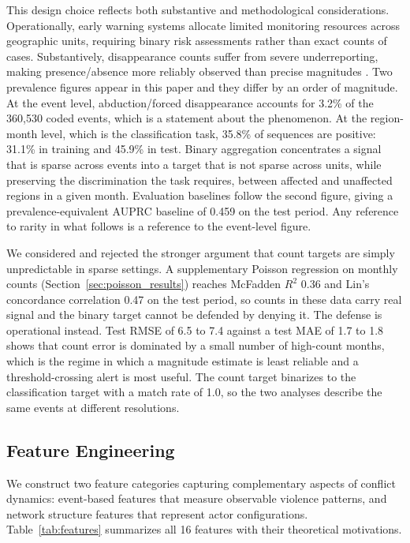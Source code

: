 \documentclass[pdflatex,sn-mathphys-num]{sn-jnl}%
\theoremstyle{thmstyleone}%
\theoremstyle{thmstyletwo}%
\theoremstyle{thmstylethree}%
\begin{document}
This design choice reflects both substantive and methodological considerations. Operationally, early warning systems allocate limited monitoring resources across geographic units, requiring binary risk assessments rather than exact counts of cases. Substantively, disappearance counts suffer from severe underreporting, making presence/absence more reliably observed than precise magnitudes \cite{hrdag2024datasets}. Two prevalence figures appear in this paper and they differ by an order of magnitude. At the event level, abduction/forced disappearance accounts for 3.2\% of the 360,530 coded events, which is a statement about the phenomenon. At the region-month level, which is the classification task, 35.8\% of sequences are positive: 31.1\% in training and 45.9\% in test. Binary aggregation concentrates a signal that is sparse across events into a target that is not sparse across units, while preserving the discrimination the task requires, between affected and unaffected regions in a given month. Evaluation baselines follow the second figure, giving a prevalence-equivalent AUPRC baseline of 0.459 on the test period. Any reference to rarity in what follows is a reference to the event-level figure.

We considered and rejected the stronger argument that count targets are simply unpredictable in sparse settings. A supplementary Poisson regression on monthly counts (Section~\ref{sec:poisson_results}) reaches McFadden $R^2$ 0.36 and Lin's concordance correlation 0.47 on the test period, so counts in these data carry real signal and the binary target cannot be defended by denying it. The defense is operational instead. Test RMSE of 6.5 to 7.4 against a test MAE of 1.7 to 1.8 shows that count error is dominated by a small number of high-count months, which is the regime in which a magnitude estimate is least reliable and a threshold-crossing alert is most useful. The count target binarizes to the classification target with a match rate of 1.0, so the two analyses describe the same events at different resolutions.

\subsection{Feature Engineering}

We construct two feature categories capturing complementary aspects of conflict dynamics: event-based features that measure observable violence patterns, and network structure features that represent actor configurations. Table~\ref{tab:features} summarizes all 16 features with their theoretical motivations.
\end{document}
